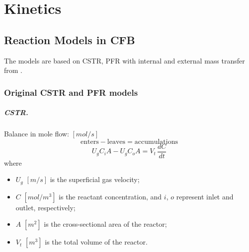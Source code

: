 \chapter{Kinetics}



\section{Reaction Models in CFB}
The models are based on CSTR, PFR with internal and external mass transfer from \citet{jiang1991baffle}.

\subsection{Original CSTR and PFR models}
\paragraph{CSTR. }
Balance in mole flow:
$[\si{mol/s}]$
\begin{equation*}
    \mathrm{enters}-\mathrm{leaves}=\mathrm{accumulations}
\end{equation*}
\begin{equation}
    U_g C_i A - U_g C_o A = V_t \, \frac{dC}{dt}
    \label{eq: kinetics - original CSTR}
\end{equation}
where
\begin{itemize}
    \item $U_g$ $[\si{m/s}]$ is the superficial gas velocity;
    \item $C$ $[\si{mol/m^3}]$ is the reactant concentration, and $i$, $o$ represent inlet and outlet, respectively;
    \item $A$ $[\si{m^2}]$ is the cross-sectional area of the reactor;
    \item $V_t$ $[\si{m^3}]$ is the total volume of the reactor.
\end{itemize}


